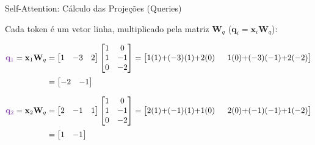 \documentclass[aspectratio=169,xcolor=dvipsnames]{beamer}
\begin{document}
\begin{frame}[shrink=10]{Self-Attention: Cálculo das Projeções (\textcolor{qcolor}{Queries})}

Cada token é um vetor linha, multiplicado pela matriz $\mathbf{W}_q$ ($\mathbf{q}_i = \mathbf{x}_i \mathbf{W}_q$):

\begin{align*}
\textcolor{qcolor}{\mathbf{q}_1} = \mathbf{x}_1 \mathbf{W}_q &=
\begin{bmatrix} 1 & -3 & 2 \end{bmatrix}
\begin{bmatrix} 1 & 0 \\ 1 & -1 \\ 0 & -2 \end{bmatrix}
= \begin{bmatrix} 1(1){+}(-3)(1){+}2(0) & \;\; 1(0){+}(-3)(-1){+}2(-2) \end{bmatrix} \\[2pt]
&= \begin{bmatrix} -2 & -1 \end{bmatrix}
\end{align*}

\vspace{4pt}

\begin{align*}
\textcolor{qcolor}{\mathbf{q}_2} = \mathbf{x}_2 \mathbf{W}_q &=
\begin{bmatrix} 2 & -1 & 1 \end{bmatrix}
\begin{bmatrix} 1 & 0 \\ 1 & -1 \\ 0 & -2 \end{bmatrix}
= \begin{bmatrix} 2(1){+}(-1)(1){+}1(0) & \;\; 2(0){+}(-1)(-1){+}1(-2) \end{bmatrix} \\[2pt]
&= \begin{bmatrix} 1 & -1 \end{bmatrix}
\end{align*}

\end{frame}

\end{document}
